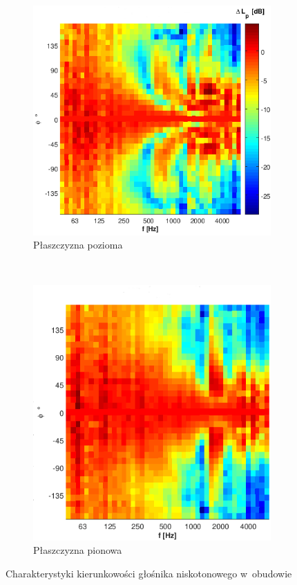 \documentclass[12pt]{oska}
\begin{document}
	\begin{figure}[!ht]
		\centering
		\begin{subfigure}[b]{.52\textwidth}
			\includegraphics[width=\textwidth]{poziom_L.png}
			\caption{Płaszczyzna pozioma}
			\label{r:L_poziom}
		\end{subfigure}
		~
		\begin{subfigure}[b]{.46\textwidth}
			\includegraphics[width=\textwidth]{pion_L.png}
			\caption{Płaszczyzna pionowa}
			\label{r:L_pion}
		\end{subfigure}
		\caption{Charakterystyki kierunkowości głośnika niskotonowego w~obudowie}
		\label{r:kierunkowosc_L}
	\end{figure}
	
\end{document}
